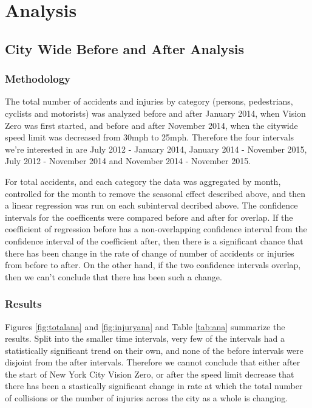 \documentclass[10pt,journal,compsoc]{IEEEtran}
\begin{document}
\section{Analysis}
\subsection{City Wide Before and After Analysis}

\subsubsection{Methodology}

The total number of accidents and injuries by category (persons, pedestrians, cyclists and motorists) was analyzed before and after January 2014, when Vision Zero was first started, and before and after November 2014, when the citywide speed limit was decreased from 30mph to 25mph.  Therefore the four intervals we're interested in are July 2012 - January 2014, January 2014 - November 2015, July 2012 - November 2014 and November 2014 - November 2015.

For total accidents, and each category the data was aggregated by month, controlled for the month to remove the seasonal effect described above, and then a linear regression was run on each subinterval decribed above.  The confidence intervals for the coefficents were compared before and after for overlap.  If the coefficient of regression before has a non-overlapping confidence interval from the confidence interval of the coefficient after, then there is a significant chance that there has been  change in the rate of change of number of accidents or injuries from before to after.  On the other hand, if the two confidence intervals overlap, then we can't conclude that there has been such a change.

\subsubsection{Results}

Figures \ref{fig:totalana} and \ref{fig:injuryana} and Table \ref{tab:ana} summarize the results.  Split into the smaller time intervals, very few of the intervals had a statistically significant trend on their own, and none of the before intervals were disjoint from the after intervals.  Therefore we cannot conclude that either after the start of New York City Vision Zero, or after the speed limit decrease that there has been a stastically significant change in rate at which the total number of collisions or the number of injuries across the city as a whole is changing.  
\end{document}
